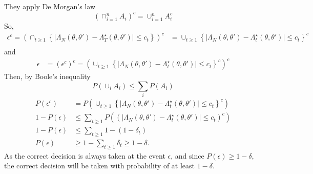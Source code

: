 \documentclass{article}
\theoremstyle{definition}
\begin{document}
They apply De Morgan's law 
\begin{equation}
    \left(\cap_{i=1}^n A_i\right)^c = \cup_{i=1}^n A_i^c
\end{equation}
So, 
\begin{equation}
\begin{split}
     \epsilon^c = \left(\cap _{t\geq 1}\left\{\mid \Lambda_N\left(\theta, \theta'\right) - \Lambda_T^{\star}\left(\theta, \theta'\right) \mid \leq c_t\right\}\right)^c &= \cup_{t\geq 1} \left\{\mid \Lambda_N\left(\theta, \theta'\right) - \Lambda_t^{\star}\left(\theta, \theta'\right) \mid \leq c_t\right\}^c \\
\end{split}
\end{equation}
and 
\begin{equation}
\begin{split}
    \epsilon &= \left(\epsilon^c\right)^c = \left(\cup_{t\geq 1} \left\{\mid \Lambda_N\left(\theta, \theta'\right) - \Lambda_t^{\star}\left(\theta, \theta'\right) \mid \leq c_t \right\}^c\right)^c 
\end{split}
\end{equation}{}
Then, by Boole's inequality
\begin{equation}\label{eq:Boole}
    P\left(\cup_i A_i \right) \leq \sum_{i} P\left(A_i\right)
\end{equation}
\begin{equation}
\begin{split}
       P\left(\epsilon^c\right) &= P\left(\cup_{t\geq 1} \left\{\mid\Lambda_N\left(\theta, \theta'\right)- \Lambda_t^{\star}\left(\theta, \theta'\right) \mid \leq c_t\right\}^c\right) \\
    1 - P\left(\epsilon\right) &\leq \sum_{t\geq 1} P\left(\left(\mid \Lambda_N\left(\theta, \theta'\right) - \Lambda_t^{\star}\left(\theta, \theta'\right) \mid \leq c_t \right)^c\right) \\ 
    1 - P\left(\epsilon\right) &\leq \sum_{t\geq 1} 1 - \left(1 - \delta_t\right) \\
    P\left(\epsilon\right) &\geq 1 - \sum_{t\geq 1} \delta_t \geq 1 - \delta.  
\end{split}
\end{equation}
As the correct decision is always taken at the event $\epsilon$, and since $P\left(\epsilon\right)\geq 1- \delta$, the correct decision will be taken with probability of at least $1 - \delta$. 
\end{document}
